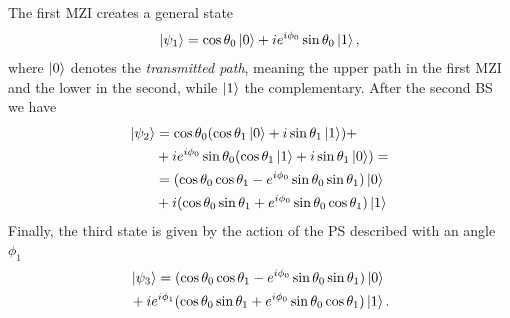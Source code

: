 \documentclass[a4paper,twocolumn,11pt,accepted=2024-01-17]{quantumarticle}
\begin{document}
\noindent The first MZI creates a general state 
\begin{align}
    \ket{\psi_1}=  \cos\theta_0 \ket{0} + ie^{i\phi_0}\sin\theta_0\ket{1},
\end{align}
where $\ket{0}$ denotes the \textit{transmitted path}, meaning the upper path in the first MZI and the lower in the second, while $\ket{1}$ the complementary. After the second BS we have
\begin{align}
    \ket{\psi_2} &= \cos\theta_0(\cos\theta_1\ket{0}\nonumber+i\sin\theta_1\ket{1}) +\nonumber\\ &+ie^{i\phi_0}\sin\theta_0(\cos\theta_1\ket{1}\nonumber+i\sin\theta_1\ket{0}) = \nonumber\\
    &= (\cos\theta_0\cos\theta_1-e^{i\phi_0}\sin\theta_0\sin\theta_1)\ket{0}\nonumber\\
    &+i(\cos\theta_0\sin\theta_1+e^{i\phi_0}\sin\theta_0\cos\theta_1)\ket{1}
    \end{align}
Finally, the third state is given by the action of the PS described with an angle $\phi_1$
\begin{align}
    &\ket{\psi_3}=(\cos\theta_0\cos\theta_1-e^{i\phi_0}\sin\theta_0\sin\theta_1)\ket{0}\nonumber\\
    &+ie^{i\phi_1}(\cos\theta_0\sin\theta_1+e^{i\phi_0}\sin\theta_0\cos\theta_1)\ket{1}.
\end{align}
\end{document}
